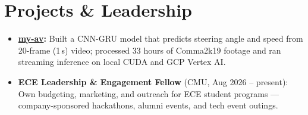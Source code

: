 \documentclass[11pt, letterpaper]{article}
\begin{document}
\section{Projects \& Leadership}
\begin{itemize}
  \item \textbf{\href{https://github.com/lordphone/my-av}{my-av}:} Built a CNN-GRU model that predicts steering angle and speed from 20-frame (1\,s) video; processed 33 hours of Comma2k19 footage and ran streaming inference on local CUDA and GCP Vertex AI.
  \item \textbf{ECE Leadership \& Engagement Fellow} (CMU, Aug 2026 -- present): Own budgeting, marketing, and outreach for ECE student programs --- company-sponsored hackathons, alumni events, and tech event outings.
\end{itemize}
\end{document}
